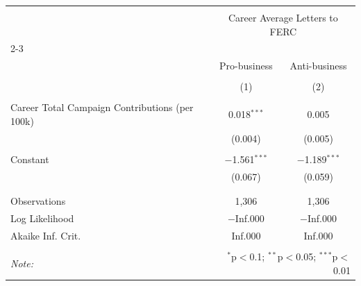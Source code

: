 
\begin{tabular}{@{\extracolsep{5pt}}lcc} 
\\[-1.8ex]\hline 
\hline \\[-1.8ex] 
 & \multicolumn{2}{c}{Career Average Letters to FERC} \\ 
\cline{2-3} 
\\[-1.8ex] & Pro-business & Anti-business \\ 
\\[-1.8ex] & (1) & (2)\\ 
\hline \\[-1.8ex] 
 Career Total Campaign Contributions (per 100k) & 0.018$^{***}$ & 0.005 \\ 
  & (0.004) & (0.005) \\ 
  & & \\ 
 Constant & $-$1.561$^{***}$ & $-$1.189$^{***}$ \\ 
  & (0.067) & (0.059) \\ 
  & & \\ 
\hline \\[-1.8ex] 
Observations & 1,306 & 1,306 \\ 
Log Likelihood & $-$Inf.000 & $-$Inf.000 \\ 
Akaike Inf. Crit. & Inf.000 & Inf.000 \\ 
\hline 
\hline \\[-1.8ex] 
\textit{Note:}  & \multicolumn{2}{r}{$^{*}$p$<$0.1; $^{**}$p$<$0.05; $^{***}$p$<$0.01} \\ 
\end{tabular} 
